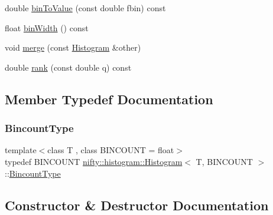 \begin{DoxyCompactItemize}
\item 
double \hyperlink{classnifty_1_1histogram_1_1Histogram_af888c1e37c7beb39c2512ffd3887a515}{bin\+To\+Value} (const double fbin) const
\item 
float \hyperlink{classnifty_1_1histogram_1_1Histogram_afe04b4100d8c023a1e77343eb0d302e9}{bin\+Width} () const
\item 
void \hyperlink{classnifty_1_1histogram_1_1Histogram_a6bf410b81f98ac6bdc2e07be83153a8d}{merge} (const \hyperlink{classnifty_1_1histogram_1_1Histogram}{Histogram} \&other)
\item 
double \hyperlink{classnifty_1_1histogram_1_1Histogram_a65a3d7833caebf1dc0d93b497fc35b9b}{rank} (const double q) const
\end{DoxyCompactItemize}


\subsection{Member Typedef Documentation}
\mbox{\label{classnifty_1_1histogram_1_1Histogram_a19ad5e06bce1f70819a7ac9cdb708cf3}} 
\subsubsection{\texorpdfstring{Bincount\+Type}{BincountType}}
{\footnotesize\ttfamily template$<$class T , class B\+I\+N\+C\+O\+U\+NT  = float$>$ \\
typedef B\+I\+N\+C\+O\+U\+NT \hyperlink{classnifty_1_1histogram_1_1Histogram}{nifty\+::histogram\+::\+Histogram}$<$ T, B\+I\+N\+C\+O\+U\+NT $>$\+::\hyperlink{classnifty_1_1histogram_1_1Histogram_a19ad5e06bce1f70819a7ac9cdb708cf3}{Bincount\+Type}}



\subsection{Constructor \& Destructor Documentation}
\mbox{\label{classnifty_1_1histogram_1_1Histogram_ad7b503ee095f0bbe52f473f7bd8b6d63}} 

